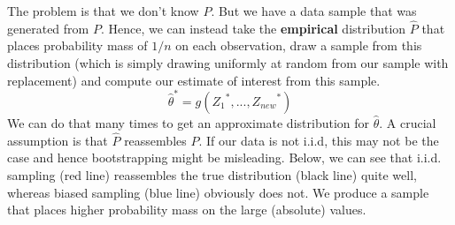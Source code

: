 \documentclass[]{book}
\newenvironment{Shaded}{\begin{snugshade}}{\end{snugshade}}
\newcommand{\KeywordTok}[1]{\textcolor[rgb]{0.13,0.29,0.53}{\textbf{{#1}}}}
\newcommand{\DataTypeTok}[1]{\textcolor[rgb]{0.13,0.29,0.53}{{#1}}}
\newcommand{\DecValTok}[1]{\textcolor[rgb]{0.00,0.00,0.81}{{#1}}}
\newcommand{\StringTok}[1]{\textcolor[rgb]{0.31,0.60,0.02}{{#1}}}
\newcommand{\CommentTok}[1]{\textcolor[rgb]{0.56,0.35,0.01}{\textit{{#1}}}}
\newcommand{\OtherTok}[1]{\textcolor[rgb]{0.56,0.35,0.01}{{#1}}}
\newcommand{\NormalTok}[1]{{#1}}
\begin{document}
The problem is that we don't know \(P\). But we have a data sample that
was generated from \(P\). Hence, we can instead take the
\textbf{empirical} distribution \(\hat{P}\) that places probability mass
of \(1/n\) on each observation, draw a sample from this distribution
(which is simply drawing uniformly at random from our sample with
replacement) and compute our estimate of interest from this sample.
\[ \hat{\theta}^{*} = g({Z_1}^{*}, ..., {Z_{new}}^{*})\] We can do that
many times to get an approximate distribution for \(\hat{\theta}\). A
crucial assumption is that \(\hat{P}\) reassembles \(P\). If our data is
not i.i.d, this may not be the case and hence bootstrapping might be
misleading. Below, we can see that i.i.d. sampling (red line)
reassembles the true distribution (black line) quite well, whereas
biased sampling (blue line) obviously does not. We produce a sample that
places higher probability mass on the large (absolute) values.

\begin{Shaded}
\end{Shaded}
\end{document}
